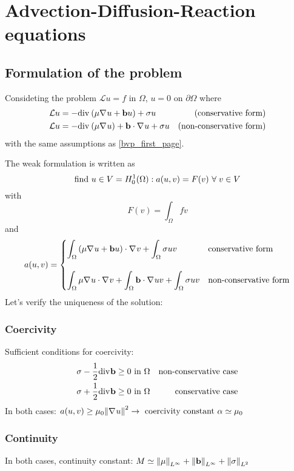 \newpage
\section{Advection-Diffusion-Reaction equations}
\subsection{Formulation of the problem}
Consideting the problem \(\mathcal{L}u = f\) in \(\Omega\), \(u=0\) on \(\partial\Omega\) where 
\begin{align*}
    &\mathcal{L} u = -\text{div}\mspace{1mu} \left(\mu \nabla\mspace{1mu} u + \textbf{b} u\right) + \sigma u & \text{(conservative form)} \\
    &\mathcal{L} u = -\text{div}\mspace{1mu} \left(\mu \nabla\mspace{1mu} u\right) + \textbf{b} \cdot \nabla\mspace{1mu} u + \sigma u & \text{(non-conservative form)}
\end{align*}
with the same assumptions as \eqref{bvp_first_page}. 

The weak formulation is written as 
\begin{equation}
    \text{find } u \in V = H^1_0(\Omega) : a(u,v) = F(v) \ \forall \; v \in V
    \label{weak_formulation_adr}
\end{equation}
with 
\[
    F(v) = \int_\Omega fv
\]
and 
\[
    a(u,v) = \begin{cases}
        \displaystyle\int_\Omega \left( \mu \nabla\mspace{1mu} u + \textbf{b} u \right) \cdot \nabla\mspace{1mu} v + \int_\Omega \sigma u v & \text{conservative form} \\
        \\
        \displaystyle\int_\Omega \mu \nabla\mspace{1mu} u \cdot \nabla\mspace{1mu} v + \int_\Omega \textbf{b} \cdot \nabla\mspace{1mu} u v + \int_\Omega \sigma u v & \text{non-conservative form}
    \end{cases}
\]
Let's verify the uniqueness of the solution:
\subsubsection*{Coercivity}
Sufficient conditions for coercivity:
\begin{align*}
    &\sigma - \frac{1}{2} \text{div}\mspace{1mu} \textbf{b} \geq 0 \text{ in } \Omega & \text{non-conservative case} \\
    &\sigma + \frac{1}{2} \text{div}\mspace{1mu} \textbf{b} \geq 0 \text{ in } \Omega & \text{conservative case}  
\end{align*}
In both cases: \(a(u,v) \geq \mu_0\norm{\nabla\mspace{1mu} u}^2 \rightarrow \text{ coercivity constant } \alpha \simeq \mu_0\)
\subsubsection*{Continuity}
In both cases, continuity constant: \(M \simeq \norm{\mu}_{L^\infty} + \norm{\textbf{b}}_{L^\infty} + \norm{\sigma}_{L^2}\)

